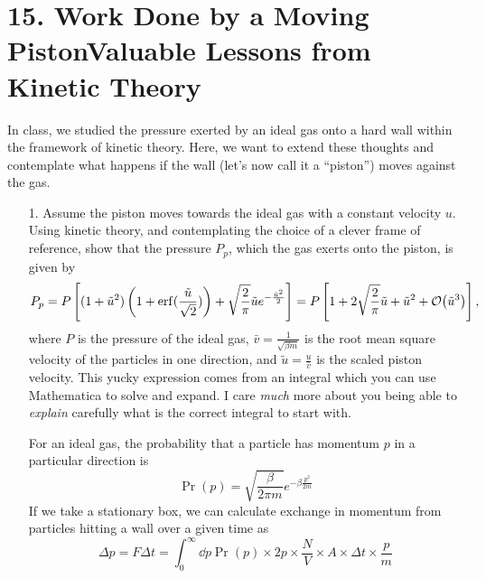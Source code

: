 \documentclass[a4paper,twoside]{article}
\begin{document}
\section*{15. Work Done by a Moving Piston\textemdash Valuable Lessons from Kinetic Theory}
In class, we studied the pressure exerted by an ideal gas onto a hard wall within the framework of kinetic theory. Here, we want to extend these thoughts and contemplate what happens if the wall (let's now call it a ``piston'') moves against the gas.

\begin{itemize}
    \item[1.] Assume the piston moves towards the ideal gas with a constant velocity $ u $. Using kinetic theory, and contemplating the choice of a clever frame of reference, show that the pressure $ P_p $, which the gas exerts onto the piston, is given by
        \begin{equation}
            P_p = P \left[ (1 +\tilde{u}^2 )\left( 1 + \erf(\frac{\tilde{u}}{\sqrt{2}}) \right) + \sqrt{\frac{2}{\pi}} \tilde{u} e^{- \frac{\tilde{u}^2}{2}} \right] = P \left[ 1 + 2 \sqrt{\frac{2}{\pi}} \tilde{u} + \tilde{u}^2 + \order{\tilde{u}^3} \right],
        \end{equation}
        where $ P $ is the pressure of the ideal gas, $ \bar{v} = \frac{1}{\sqrt{\beta m}} $ is the root mean square velocity of the particles in one direction, and $ \tilde{u} = \frac{u}{\bar{v}} $ is the scaled piston velocity. This yucky expression comes from an integral which you can use Mathematica to solve and expand. I care \textit{much} more about you being able to \textit{explain} carefully what is the correct integral to start with.
        \begin{problem}
            For an ideal gas, the probability that a particle has momentum $ p $ in a particular direction is
            \begin{equation}
                \Pr(p) = \sqrt{\frac{\beta}{2 \pi m}} e^{- \beta \frac{p^2}{2m}}
            \end{equation}
            If we take a stationary box, we can calculate exchange in momentum from particles hitting a wall over a given time as
            \begin{equation}
                \Delta p = F \Delta t = \int_{0}^{\infty} \dd{p} \Pr(p) \times 2 p \times \frac{N}{V} \times A \times \Delta t \times \frac{p}{m}
            \end{equation}

\end{problem}
\end{itemize}
\end{document}
